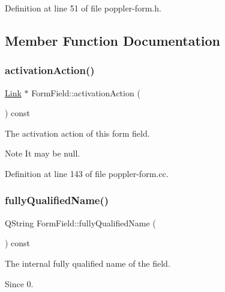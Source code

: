 Definition at line 51 of file poppler-\/form.\+h.



\subsection{Member Function Documentation}
\mbox{\label{class_poppler_1_1_form_field_a3dc454f126c810978473d655686c214a}} 
\subsubsection{\texorpdfstring{activation\+Action()}{activationAction()}}
{\footnotesize\ttfamily \hyperlink{class_poppler_1_1_link}{Link} $\ast$ Form\+Field\+::activation\+Action (\begin{DoxyParamCaption}{ }\end{DoxyParamCaption}) const}

The activation action of this form field.

\begin{DoxyNote}{Note}
It may be null. 
\end{DoxyNote}


Definition at line 143 of file poppler-\/form.\+cc.

\mbox{\label{class_poppler_1_1_form_field_a739db6a4f58196776f7e83adbf3453b1}} 
\subsubsection{\texorpdfstring{fully\+Qualified\+Name()}{fullyQualifiedName()}}
{\footnotesize\ttfamily Q\+String Form\+Field\+::fully\+Qualified\+Name (\begin{DoxyParamCaption}{ }\end{DoxyParamCaption}) const}

The internal fully qualified name of the field. \begin{DoxySince}{Since}
0. 
\end{DoxySince}



